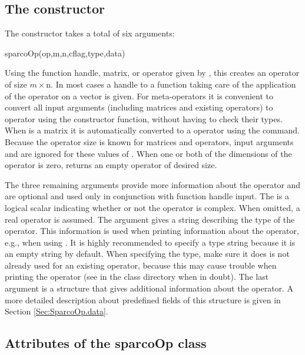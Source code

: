 \subsection{The  constructor}
\label{Sec:SparcoOpConstructor}

The  constructor takes a total of six arguments:
\begin{codeblock}
sparcoOp(op,m,n,cflag,type,data)
\end{codeblock}
Using the function handle, matrix, or \sparco{} operator given by
, this creates an operator of size $m\times $n. In most
cases a handle to a function taking care of the application of the
operator on a vector is given. For meta-operators it is convenient to
convert all input arguments (including matrices and existing
operators) to \sparco{} operator using the constructor function,
without having to check their types. When  is a matrix it is
automatically converted to a \sparco{} operator using the
 command. Because the operator size is known for
matrices and operators, input arguments  and  are
ignored for these values of . When one or both of the
dimensions of the operator is zero,  returns an empty
operator of desired size.


The three remaining arguments provide more information about the
operator and are optional and used only in conjunction with function
handle input. The  is a logical scalar indicating whether
or not the operator is complex. When omitted, a real operator is
assumed. The  argument gives a string describing the type
of the operator. This information is used when printing information
about the operator, e.g., when using . It is highly
recommended to specify a type string because it is an empty string by
default. When specifying the type, make sure it does is not already
used for an existing operator, because this may cause trouble when
printing the operator (see  in the class directory when
in doubt). The last argument is a  structure that gives
additional information about the operator. A more detailed description
about predefined fields of this structure is given in Section
\ref{Sec:SparcoOp.data}.


\subsection{Attributes of the sparcoOp class}
\label{Sec:SparcoRealComplex}\label{Sec:SparcoOpFields}
\label{Sec:SparcoOpFieldLinear}\label{Sec:SparcoCounters}
\label{Sec:SparcoOp.data}

